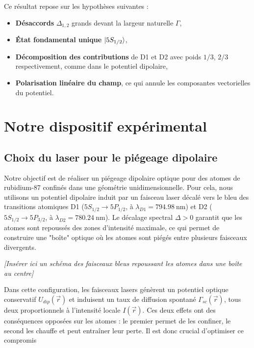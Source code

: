 Ce résultat repose sur les hypothèses suivantes :
\begin{itemize}[label = $\bullet$]
	\item {\bf Désaccords} $\Delta_{1,2}$  grands devant la largeur naturelle $\Gamma$,
	\item {\bf État fondamental unique} $\ket{5S_{1/2}}$,
	\item {\bf Décomposition des contributions} de D1 et D2 avec poids $1/3$, $2/3$ respectivement, comme dans le potentiel dipolaire,
	\item {\bf Polarisation linéaire du champ}, ce qui annule les composantes vectorielles du potentiel.
\end{itemize}






\section{Notre dispositif expérimental}

\subsection{Choix du laser pour le piégeage dipolaire}

Notre objectif est de réaliser un piégeage dipolaire optique pour des atomes de rubidium-87 confinés dans une géométrie unidimensionnelle. Pour cela, nous utilisons un potentiel dipolaire induit par un faisceau laser décalé vers le bleu des transitions atomiques D1 ($5S_{1/2} \rightarrow 5P_{1/2}$, à $\lambda_{D1} = 794.98~\text{nm}$) et D2 ($5S_{1/2} \rightarrow 5P_{3/2}$, à $\lambda_{D2} = 780.24~\text{nm}$). Le décalage spectral $\Delta > 0$ garantit que les atomes sont repoussés des zones d’intensité maximale, ce qui permet de construire une "boîte" optique où les atomes sont piégés entre plusieurs faisceaux divergents.

\begin{center}
\textit{[Insérer ici un schéma des faisceaux bleus repoussant les atomes dans une boîte au centre]}
\end{center}

\vspace{1em}

Dans cette configuration, les faisceaux lasers génèrent un potentiel optique conservatif $U_{dip}(\vec{r})$ et induisent un taux de diffusion spontané $\Gamma_{sc}(\vec{r})$, tous deux proportionnels à l’intensité locale $I(\vec{r})$. Ces deux effets ont des conséquences opposées sur les atomes : le premier permet de les confiner, le second les chauffe et peut entraîner leur perte. Il est donc crucial d’optimiser ce compromis


